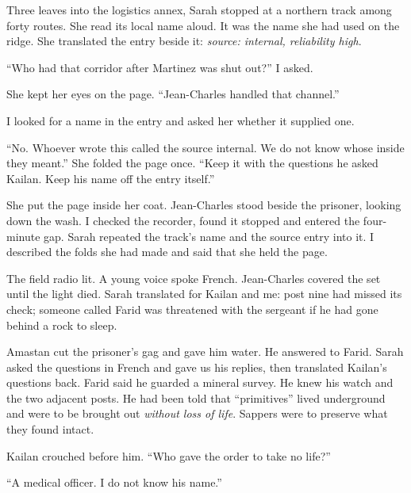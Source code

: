 Three leaves into the logistics annex, Sarah stopped at a northern track among forty routes. She read its local name aloud. It was the name she had used on the ridge. She translated the entry beside it: \emph{source: internal, reliability high}.\par

``Who had that corridor after Martinez was shut out?'' I asked.\par

She kept her eyes on the page. ``Jean-Charles handled that channel.''\par

I looked for a name in the entry and asked her whether it supplied one.\par

``No. Whoever wrote this called the source internal. We do not know whose inside they meant.'' She folded the page once. ``Keep it with the questions he asked Kailan. Keep his name off the entry itself.''\par

She put the page inside her coat. Jean-Charles stood beside the prisoner, looking down the wash. I checked the recorder, found it stopped and entered the four-minute gap. Sarah repeated the track's name and the source entry into it. I described the folds she had made and said that she held the page.\par

The field radio lit. A young voice spoke French. Jean-Charles covered the set until the light died. Sarah translated for Kailan and me: post nine had missed its check; someone called Farid was threatened with the sergeant if he had gone behind a rock to sleep.\par

Amastan cut the prisoner's gag and gave him water. He answered to Farid. Sarah asked the questions in French and gave us his replies, then translated Kailan's questions back. Farid said he guarded a mineral survey. He knew his watch and the two adjacent posts. He had been told that ``primitives'' lived underground and were to be brought out \emph{without loss of life}. Sappers were to preserve what they found intact.\par

Kailan crouched before him. ``Who gave the order to take no life?''\par

``A medical officer. I do not know his name.''\par

